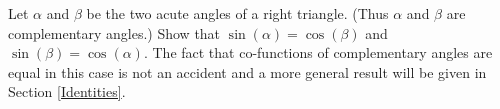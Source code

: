 {Let $\alpha$ and $\beta$ be the two acute angles of a right triangle.  (Thus $\alpha$ and $\beta$ are complementary angles.)  Show that $\sin(\alpha) = \cos(\beta)$ and $\sin(\beta) = \cos(\alpha)$.  The fact that co-functions of complementary angles are equal in this case is not an accident and a more general result will be given in Section \ref{Identities}.
\label{cofunctionforeshadowing}}
{}